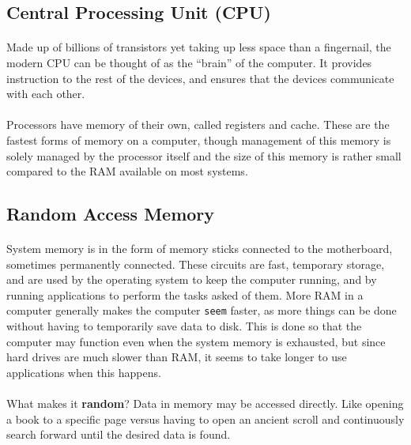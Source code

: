 \documentclass[letter,10pt]{article}
\begin{document}
\subsection{Central Processing Unit (CPU)}
\paragraph{}Made up of billions of transistors yet taking up less space than a fingernail, the modern CPU can be thought of as the ``brain'' of the computer. It provides instruction to the rest of the devices, and ensures that the devices communicate with each other.

\paragraph{}Processors have memory of their own, called registers and cache. These are the fastest forms of memory on a computer, though management of this memory is solely managed by the processor itself and the size of this memory is rather small compared to the RAM available on most systems.

\subsection{Random Access Memory}\label{sec:ram}
\paragraph{}System memory is in the form of memory sticks connected to the motherboard, sometimes permanently connected. These circuits are fast, temporary storage, and are used by the operating system to keep the computer running, and by running applications to perform the tasks asked of them. More RAM in a computer generally makes the computer \texttt{seem} faster, as more things can be done without having to temporarily save data to disk. This is done so that the computer may function even when the system memory is exhausted, but since hard drives are much slower than RAM, it seems to take longer to use applications when this happens.

\paragraph{}What makes it \textbf{random}? Data in memory may be accessed directly. Like opening a book to a specific page versus having to open an ancient scroll and continuously search forward until the desired data is found.
\end{document}
